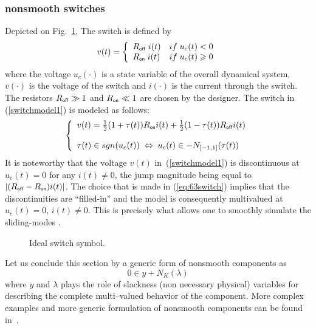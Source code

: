 \subsubsection{nonsmooth switches} Depicted on Fig.~\ref{fig:IDEAL_SWITCH}, The switch is defined by 
\begin{equation}\label{switchmodel1}
v(t)=\left\{\begin{array}{ll} R_\off\; i(t) & \mbox{if}\;u_{c}(t) < 0 \\   R_\on\; i(t) & \mbox{if}\;u_{c}(t) \geq  0  \end{array}\right.
\end{equation} 
where the voltage $u_{c}(\cdot)$ is a state variable of the overall dynamical system, $v(\cdot)$ is the voltage of the switch and $i(\cdot)$ is the current through the switch. The resistors $R_\off \gg 1$ and $R_\on \ll 1$ are chosen by the designer. The switch in (\ref{switchmodel1}) is modeled as follows:
\begin{equation}
  \label{eq:63switch}
\left\{\begin{array}{l}
v(t)=\frac{1}{2}(1+\tau(t))R_\on i(t)+\frac{1}{2}(1-\tau(t))R_\off i(t)  \\ \\ \tau(t) \in \mbox{sgn}(u_{c}(t)) \; \Leftrightarrow \; u_{c}(t) \in -N_{[-1,1]}(\tau(t))
\end{array}\right.
\end{equation}
 It is noteworthy that the voltage $v(t)$ in~(\ref{switchmodel1}) is discontinuous at $u_{c}(t)=0$ for any $i(t) \not = 0$, the jump magnitude being equal to $|(R_\off-R_\on)i(t)|$. The choice that is made in (\ref{eq:63switch}) implies that the discontinuities are ``filled-in'' and the model is consequently multivalued at $u_{c}(t)=0$,  $i(t) \not = 0$. This is precisely what allows one to smoothly simulate the sliding-modes \cite{Acary.Brogliato2009}. 
\begin{figure}
  \centering
  \scalebox{0.7}{
  
  }
  \caption{Ideal switch symbol.}
  \label{fig:IDEAL_SWITCH}
\end{figure}
Let us conclude this section by a generic form of nonsmooth components as
\begin{equation}
  \label{eq:nonsmooth}
   0 \in y + N_K(\lambda)
\end{equation}
where $y$ and $\lambda$ plays the role of slackness (non necessary physical) variables for describing the complete multi--valued behavior of the component. More complex examples and more generic formulation of nonsmooth components can be found in~\cite{Acary.ea_RR2009}.


